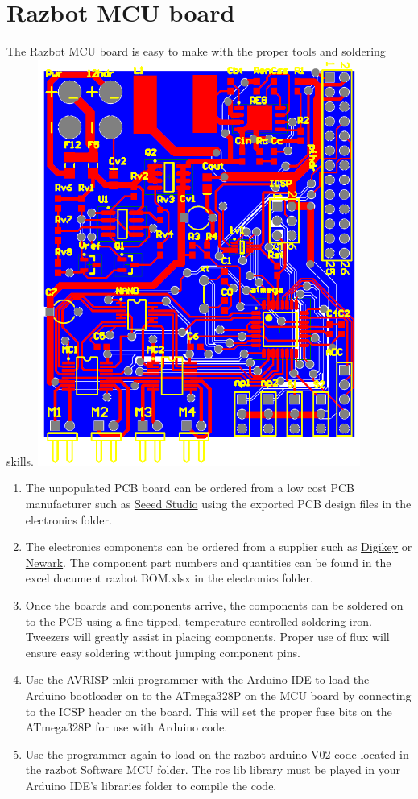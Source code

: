 \documentclass[12pt,titlepage,oneside]{memoir}
\begin{document}
\section{Razbot MCU board}

The Razbot MCU board is easy to make with the proper tools and soldering skills.
\includegraphics[width=400px]{picture/mcu.png}


\begin{enumerate}
\item The unpopulated PCB board can be ordered from a low cost PCB manufacturer such as \href{http://www.seeedstudio.com/}{Seeed Studio} using the exported PCB design files in the electronics folder. 
\item The electronics components can be ordered from a supplier such as \href{http://www.digikey.com/}{Digikey} or \href{http://www.Newark.com/}{Newark}. The component part numbers and quantities can be found in the excel document razbot BOM.xlsx in the electronics folder.
\item Once the boards and components arrive, the components can be soldered on to the PCB using a fine tipped, temperature controlled soldering iron. Tweezers will greatly assist in placing components. Proper use of flux will ensure easy soldering without jumping component pins.
\item Use the AVRISP-mkii programmer with the Arduino IDE to load the Arduino bootloader on to the ATmega328P on the MCU board by connecting to the ICSP header on the board. This will set the proper fuse bits on the ATmega328P for use with Arduino code.
\item Use the programmer again to load on the razbot arduino V02 code located in the razbot Software MCU folder. The ros lib library must be played in your Arduino IDE's libraries folder to compile the code. 
\end{enumerate}
\end{document}
